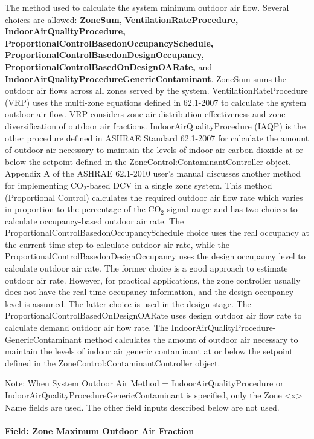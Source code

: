 The method used to calculate the system minimum outdoor air flow. Several choices are allowed: \textbf{ZoneSum}, \textbf{VentilationRateProcedure,} \textbf{IndoorAirQualityProcedure, ProportionalControlBasedonOccupancySchedule,} \textbf{ProportionalControlBasedonDesignOccupancy,} \textbf{ProportionalControlBasedOnDesignOARate,} and \textbf{IndoorAirQualityProcedureGenericContaminant}. ZoneSum sums the outdoor air flows across all zones served by the system. VentilationRateProcedure (VRP) uses the multi-zone equations defined in 62.1-2007 to calculate the system outdoor air flow. VRP considers zone air distribution effectiveness and zone diversification of outdoor air fractions. IndoorAirQualityProcedure (IAQP) is the other procedure defined in ASHRAE Standard 62.1-2007 for calculate the amount of outdoor air necessary to maintain the levels of indoor air carbon dioxide at or below the setpoint defined in the ZoneControl:ContaminantController object. Appendix A of the ASHRAE 62.1-2010 user's manual discusses another method for implementing CO\(_{2}\)-based DCV in a single zone system. This method (Proportional Control) calculates the required outdoor air flow rate which varies in proportion to the percentage of the CO\(_{2}\) signal range and has two choices to calculate occupancy-based outdoor air rate. The ProportionalControlBasedonOccupancySchedule choice uses the real occupancy at the current time step to calculate outdoor air rate, while the ProportionalControlBasedonDesignOccupancy uses the design occupancy level to calculate outdoor air rate. The former choice is a good approach to estimate outdoor air rate. However, for practical applications, the zone controller usually does not have the real time occupancy information, and the design occupancy level is assumed. The latter choice is used in the design stage. The ProportionalControlBasedOnDesignOARate uses design outdoor air flow rate to calculate demand outdoor air flow rate. The IndoorAirQualityProcedure-GenericContaminant method calculates the amount of outdoor air necessary to maintain the levels of indoor air generic contaminant at or below the setpoint defined in the ZoneControl:ContaminantController object.

Note: When System Outdoor Air Method = IndoorAirQualityProcedure or IndoorAirQualityProcedureGenericContaminant is specified, only the Zone \textless{}x\textgreater{} Name fields are used. The other field inputs described below are not used.

\paragraph{Field: Zone Maximum Outdoor Air Fraction}\label{field-zone-maximum-outdoor-air-fraction}

